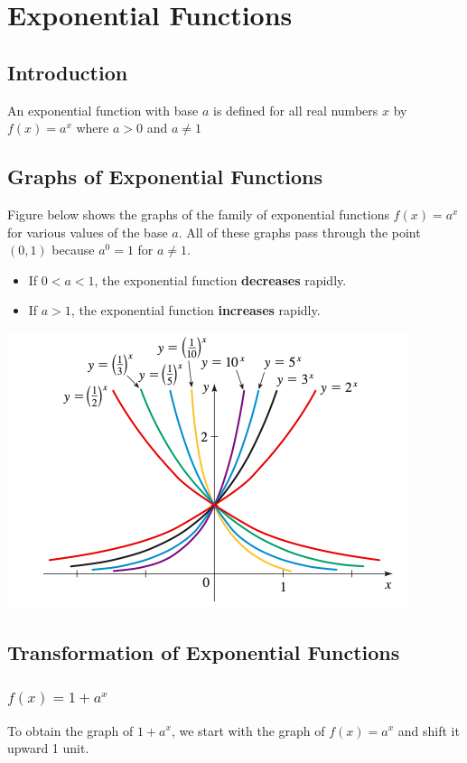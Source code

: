 \documentclass{book}
\begin{document}
	\chapter{Exponential Functions}
	\section{Introduction}
	\begin{mdframed}[backgroundcolor=yellow]
		An exponential function with base $a$ is defined for all real numbers $x$ by $f(x) = a^x$ where $a>0$ and $a \neq 1$
	\end{mdframed}
	
	\section{Graphs of Exponential Functions}
	 Figure below shows the graphs of the family of exponential functions $f(x) = a^x$ for various values of the base $a$. All of these graphs pass through the point $(0,1)$ because $a^0 = 1$ for $a \neq 1$.
	 
	 \begin{itemize}
	 	\item If $0<a<1$, the exponential function \textbf{decreases} rapidly.
	 	\item If $a>1$, the exponential function \textbf{increases} rapidly.
	 \end{itemize}
	 
	 \includegraphics[scale=1.0]{expgraph}
	
	\section{Transformation of Exponential Functions}
	 \subsection{$f(x)=1+a^x$}
	 To obtain the graph of $1+a^x$, we start with the graph of $f(x) = a^x$ and shift it upward 1 unit.
	 
\end{document}
